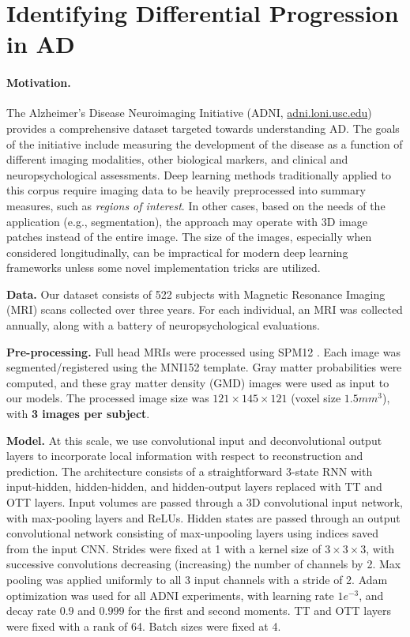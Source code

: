 \section{Identifying Differential Progression in AD}\label{sec:adni}
\paragraph{Motivation.} The Alzheimer's Disease Neuroimaging Initiative (ADNI, \url{adni.loni.usc.edu})  provides a comprehensive dataset
targeted towards understanding AD. The goals of the initiative include measuring the development of the disease as a function of different imaging modalities, other biological markers, and clinical and neuropsychological assessments. 
Deep learning methods traditionally applied to this corpus require imaging data to be heavily preprocessed into summary measures, such as \textit{regions of interest}.
In other cases, based on the needs of the application (e.g., segmentation),
the approach may operate with 3D image patches instead of the entire image. 
The size of the images, especially when considered longitudinally, can be impractical for modern deep learning frameworks unless some novel
implementation tricks are utilized. 

\textbf{Data.} Our dataset consists of 522 subjects with Magnetic Resonance Imaging (MRI) scans collected over three years. For each individual, an MRI was collected annually, along with a battery of neuropsychological evaluations.

\textbf{Pre-processing.}
Full head MRIs were processed using SPM12 \cite{ashburner2014spm12}. Each image was segmented/registered using the MNI152 template. Gray matter probabilities were computed, and these gray matter density (GMD) images were used as input to our models.
The processed image size was $121 \times 145 \times 121$ (voxel size $1.5mm^3$), with \textbf{3 images per subject}.

\textbf{Model.} At this scale, we use convolutional input and deconvolutional output layers to incorporate local information with respect to reconstruction and prediction. The architecture consists of a straightforward 3-state RNN with input-hidden, hidden-hidden, and hidden-output layers replaced with TT and OTT layers. Input volumes are passed through a 3D convolutional input network, with max-pooling layers and ReLUs.
Hidden states are passed through an output convolutional network consisting of max-unpooling layers using indices
saved from the input CNN.
Strides were fixed at 1 with a kernel size of $3\times 3 \times 3$,
with successive convolutions decreasing (increasing) the number of channels by 2.
Max pooling was applied uniformly to all 3 input channels with a stride of 2. Adam optimization \cite{kingma2014adam} was used for all
ADNI experiments, with learning rate $1e^{-3}$, and decay rate $0.9$ and $0.999$ for the first and second moments. TT and OTT layers were fixed with a rank of 64. Batch sizes were fixed at 4.


